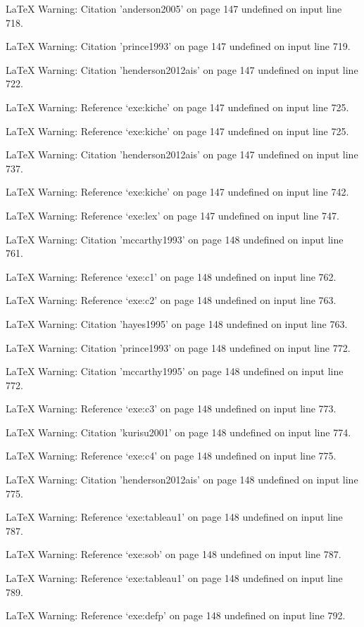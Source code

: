 LaTeX Warning: Citation 'anderson2005' on page 147 undefined on input line 718.


LaTeX Warning: Citation 'prince1993' on page 147 undefined on input line 719.


LaTeX Warning: Citation 'henderson2012ais' on page 147 undefined on input line 722.


LaTeX Warning: Reference `exe:kiche' on page 147 undefined on input line 725.


LaTeX Warning: Reference `exe:kiche' on page 147 undefined on input line 725.


LaTeX Warning: Citation 'henderson2012ais' on page 147 undefined on input line 737.


LaTeX Warning: Reference `exe:kiche' on page 147 undefined on input line 742.


LaTeX Warning: Reference `exe:lex' on page 147 undefined on input line 747.


LaTeX Warning: Citation 'mccarthy1993' on page 148 undefined on input line 761.


LaTeX Warning: Reference `exe:c1' on page 148 undefined on input line 762.


LaTeX Warning: Reference `exe:c2' on page 148 undefined on input line 763.


LaTeX Warning: Citation 'hayes1995' on page 148 undefined on input line 763.


LaTeX Warning: Citation 'prince1993' on page 148 undefined on input line 772.


LaTeX Warning: Citation 'mccarthy1995' on page 148 undefined on input line 772.


LaTeX Warning: Reference `exe:c3' on page 148 undefined on input line 773.


LaTeX Warning: Citation 'kurisu2001' on page 148 undefined on input line 774.


LaTeX Warning: Reference `exe:c4' on page 148 undefined on input line 775.


LaTeX Warning: Citation 'henderson2012ais' on page 148 undefined on input line 775.


LaTeX Warning: Reference `exe:tableau1' on page 148 undefined on input line 787.


LaTeX Warning: Reference `exe:sob' on page 148 undefined on input line 787.


LaTeX Warning: Reference `exe:tableau1' on page 148 undefined on input line 789.


LaTeX Warning: Reference `exe:defp' on page 148 undefined on input line 792.


